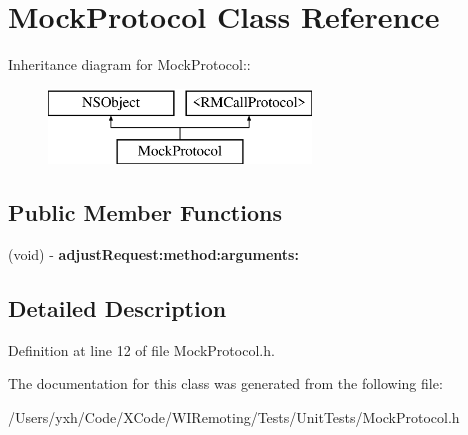 \hypertarget{interface_mock_protocol}{
\section{MockProtocol Class Reference}
\label{interface_mock_protocol}
}
Inheritance diagram for MockProtocol::\begin{figure}[H]
\begin{center}
\leavevmode
\includegraphics[height=2cm]{interface_mock_protocol}
\end{center}
\end{figure}
\subsection*{Public Member Functions}
\begin{DoxyCompactItemize}
\item 
\hypertarget{interface_mock_protocol_af1dbb6f419ecd6fe8cb3f73e2dee276b}{
(void) -\/ {\bfseries adjustRequest:method:arguments:}}
\label{interface_mock_protocol_af1dbb6f419ecd6fe8cb3f73e2dee276b}

\end{DoxyCompactItemize}


\subsection{Detailed Description}


Definition at line 12 of file MockProtocol.h.

The documentation for this class was generated from the following file:\begin{DoxyCompactItemize}
\item 
/Users/yxh/Code/XCode/WIRemoting/Tests/UnitTests/MockProtocol.h\end{DoxyCompactItemize}
